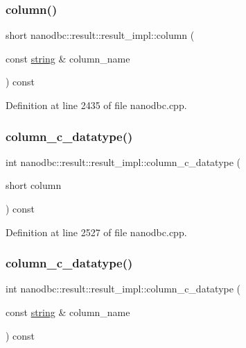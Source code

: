 \subsubsection{\texorpdfstring{column()}{column()}}
{\footnotesize\ttfamily short nanodbc\+::result\+::result\+\_\+impl\+::column (\begin{DoxyParamCaption}\item[{const \mbox{\hyperlink{namespacenanodbc_abfc0ece56278e590911ec8352774c212}{string}} \&}]{column\+\_\+name }\end{DoxyParamCaption}) const\hspace{0.3cm}{\ttfamily [inline]}}



Definition at line 2435 of file nanodbc.\+cpp.

\mbox{\label{classnanodbc_1_1result_1_1result__impl_ade6c0091bf4263f56ef20601043f4a2c}} 
\subsubsection{\texorpdfstring{column\_c\_datatype()}{column\_c\_datatype()}\hspace{0.1cm}{\footnotesize\ttfamily [1/2]}}
{\footnotesize\ttfamily int nanodbc\+::result\+::result\+\_\+impl\+::column\+\_\+c\+\_\+datatype (\begin{DoxyParamCaption}\item[{short}]{column }\end{DoxyParamCaption}) const\hspace{0.3cm}{\ttfamily [inline]}}



Definition at line 2527 of file nanodbc.\+cpp.

\mbox{\label{classnanodbc_1_1result_1_1result__impl_a42bc1467b6b93ca1b0583532d543334b}} 
\subsubsection{\texorpdfstring{column\_c\_datatype()}{column\_c\_datatype()}\hspace{0.1cm}{\footnotesize\ttfamily [2/2]}}
{\footnotesize\ttfamily int nanodbc\+::result\+::result\+\_\+impl\+::column\+\_\+c\+\_\+datatype (\begin{DoxyParamCaption}\item[{const \mbox{\hyperlink{namespacenanodbc_abfc0ece56278e590911ec8352774c212}{string}} \&}]{column\+\_\+name }\end{DoxyParamCaption}) const\hspace{0.3cm}{\ttfamily [inline]}}



